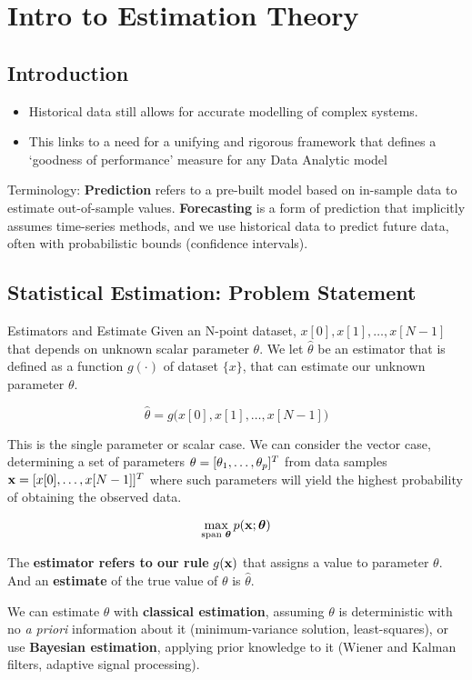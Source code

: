 \chapter{Intro to Estimation Theory}
\section{Introduction}
\begin{itemize}
    \item Historical data still allows for accurate modelling of complex systems.
    \item This links to a need for a unifying and rigorous framework that defines a `goodness of performance' measure for any Data Analytic model
\end{itemize}

Terminology: \textbf{Prediction} refers to a pre-built model based on in-sample data to estimate out-of-sample values. \textbf{Forecasting} is a form of prediction that implicitly assumes time-series methods, and we use historical data to predict future data, often with probabilistic bounds (confidence intervals).

\section{Statistical Estimation: Problem Statement}

\begin{definitionbox}{Estimators and Estimate}
Given an N-point dataset, $x[0],x[1],\ldots,x[N-1]$ that depends on unknown scalar parameter $\theta$. We let $\hat{\theta}$ be an estimator that is defined as a function $g(\cdot)$ of dataset $\{x\}$, that can estimate our unknown parameter $\theta$.

\begin{equation}
    \hat{\theta}=g\big(x[0],x[1],\ldots,x[N-1]\big)
\end{equation}

This is the single parameter or scalar case. We can consider the vector case, determining a set of parameters $\mathbf{\theta} = [\theta_1, \ldots,\theta_p]^T$ from data samples $\mathbf{x} = [x[0], \ldots,x[N-1]]^T$ where such parameters will yield the highest probability of obtaining the observed data. 

\begin{equation}
    \max_{\text{span }\boldsymbol{ \theta}}p(\mathbf{x};\boldsymbol{\theta})
\end{equation}

The \textbf{estimator refers to our rule }$g(\mathbf{x})$ that assigns a value to parameter $\theta$. And an \textbf{estimate} of the true value of $\theta$ is $\hat{\theta}$.

\end{definitionbox}
We can estimate $\theta$ with \textbf{classical estimation}, assuming $\theta$ is deterministic with no \textit{a priori} information about it (minimum-variance solution, least-squares), or use \textbf{Bayesian estimation}, applying prior knowledge to it (Wiener and Kalman filters, adaptive signal processing).\\

